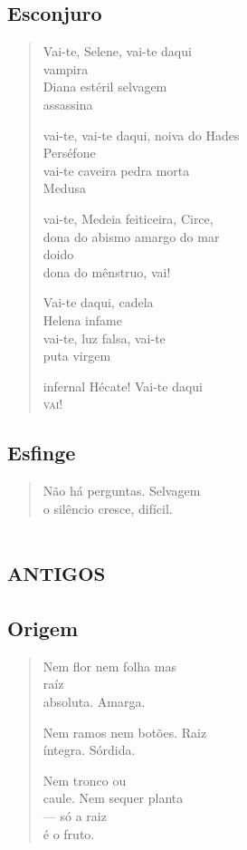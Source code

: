 \chapter{Esconjuro}

\begin{verse}
Vai-te, Selene, vai-te daqui\\
vampira\\
Diana estéril selvagem\\
assassina

vai-te, vai-te daqui, noiva do Hades\\
Perséfone\\
vai-te caveira pedra morta\\
Medusa

vai-te, Medeia feiticeira, Circe,\\
dona do abismo amargo do mar\\
doido\\
dona do mênstruo, vai!

Vai-te daqui, cadela\\
Helena infame\\
vai-te, luz falsa, vai-te\\
puta virgem

infernal Hécate! Vai-te daqui\\
\textsc{vai}!
\end{verse}

\chapter{Esfinge}

\begin{verse}
Não há perguntas. Selvagem\\
o silêncio cresce, difícil.
\end{verse}

\part*{\textsc{antigos}}

\chapter{Origem}

\begin{verse}
Nem flor nem folha mas\\
raíz\\
absoluta. Amarga.

\qquad Nem ramos nem botões. Raiz\\
\qquad\quad íntegra. Sórdida.

\qquad\quad Nem tronco ou\\
\qquad\quad caule. Nem sequer planta\\
\qquad\quad --- só a raiz\\
\qquad\quad\quad é o fruto.
\end{verse}

